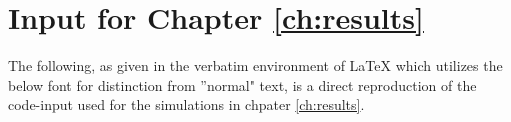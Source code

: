 \chapter{Input for Chapter \ref{ch:results}}
\label{app:input}

The following, as given in the verbatim environment of LaTeX which utilizes
the below font for distinction from ''normal" text, is a direct reproduction of
the code-input used for the simulations in chpater \ref{ch:results}.\\

